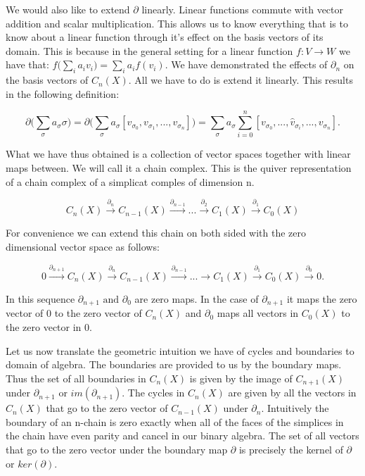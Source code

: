 We would also like to extend $\partial$ linearly. Linear functions commute with vector addition and scalar multiplication. This allows us to know everything that is to know about a linear function through it's effect on the basis vectors of its domain. This is because in the general setting for a linear function $f : V \to W$ we have that: $ f\big(\sum_{i}{a_iv_i}\big) = \sum_i{a_if(v_i)} $. We have demonstrated the effects of $\partial_n$ on the basis vectors of $C_n(X)$. All we have to do is extend it linearly. This results in the following definition:


$$ \partial\bigg(\sum_{\sigma}a_{\sigma}\sigma\bigg) = \partial\bigg(\sum_{\sigma}{a_{\sigma}[v_{\sigma_0}, v_{\sigma_1}, ..., v_{\sigma_n}]}\bigg) = \sum_{\sigma}{a_{\sigma} \sum_{i=0}^{n}[v_{\sigma_0},..., \hat{v}_{\sigma_i}, ..., v_{\sigma_n}]} .$$


What we have thus obtained is a collection of vector spaces together with linear maps between. We will call it a chain complex. This is the quiver representation of a chain complex of a simplicat comples of dimension n.


$$ C_n(X) \overset{\partial_n}{\longrightarrow} C_{n-1}(X) \overset{\partial_{n-1}}{\longrightarrow} ... \overset{\partial_2}{\longrightarrow} C_1(X) \overset{\partial_1}{\longrightarrow} C_0(X) $$

For convenience we can extend this chain on both sided with the zero dimensional vector space as follows:

$$ 0 \overset{\partial_{n+1}}{\longrightarrow} C_n(X) \overset{\partial_{n}}{\longrightarrow} C_{n-1}(X) \overset{\partial_{n-1}}{\longrightarrow} ... \longrightarrow C_1(X) \overset{\partial_1}{\longrightarrow} C_0(X) \overset{\partial_0}{\longrightarrow} 0. $$

In this sequence $\partial_{n+1} \text{ and } \partial_{0}$ are zero maps. In the case of $\partial_{n+1}$ it maps the zero vector of $0$ to the zero vector of $C_n(X)$ and $\partial_0$ maps all vectors in $C_0(X)$ to the zero vector in $0$.

Let us now translate the geometric intuition we have of cycles and boundaries to domain of algebra. The boundaries are provided to us by the boundary maps. Thus the set of all boundaries in $C_n(X)$ is given by the image of $C_{n+1}(X)$ under $\partial_{n+1}$ or $im(\partial_{n+1})$. The cycles in $C_n(X)$ are given by all the vectors in $C_n(X)$ that go to the zero vector of $C_{n-1}(X)$ under $\partial_n$. Intuitively the boundary of an n-chain is zero exactly when all of the faces of the simplices in the chain have even parity and cancel in our binary algebra. The set of all vectors that go to the zero vector under the boundary map $\partial$ is precisely the kernel of $\partial$ or $ker(\partial)$.

